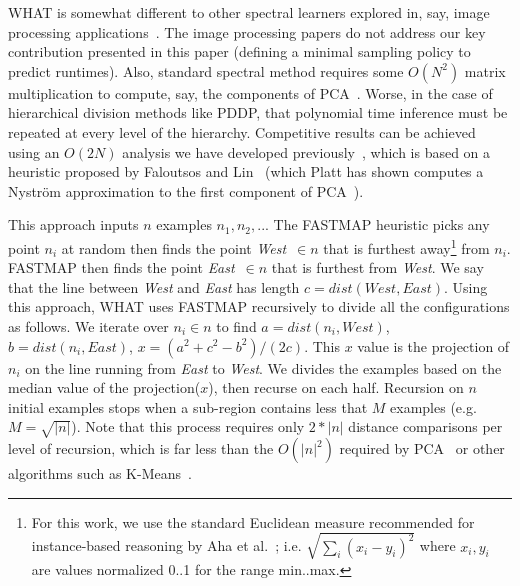 \documentclass{sig-alternative}
\begin{document}
WHAT is somewhat different to other spectral
learners explored in, say, image processing applications~\cite{shi00}.
The image processing papers do not address
our key contribution presented in this paper  (defining
 a minimal sampling policy to predict runtimes).
Also,
standard spectral method requires some $O(N^2)$ matrix multiplication to compute, say, the components
of PCA~\cite{ilin10}. Worse, in the case of hierarchical division methods like PDDP,
that polynomial time inference must be repeated at every level of the hierarchy.
Competitive results can be achieved
using an $O(2N)$ analysis we have developed previously~\cite{me12d}, which is  based on  a heuristic proposed by
Faloutsos and Lin~\cite{Faloutsos1995}
(which
Platt has
  shown computes a Nystr\"om
  approximation to the first component of
  PCA~\cite{platt05}).
  
  This approach inputs
$n$
examples $n_1,n_2,..$. The FASTMAP heuristic
picks any
point $n_i$ at random then  finds
 the point  {\em West}~$\in n$ that is
furthest away\footnote{
 For this work, we use the standard Euclidean measure recommended for
instance-based reasoning by Aha et al.~\cite{aha91};
i.e. $\sqrt{\sum_i(x_i-y_i)^2}$ where $x_i,y_i$
are values normalized 0..1 for the range min..max.}
from $n_i$.
FASTMAP then
finds the point {\em East}~$\in n$
that is furthest from {\em West}.
We say that the line between {\em West} and {\em East} has  length  
$c=\mathit{dist}(\mathit{West},\mathit{East})$.
Using this  approach, WHAT uses FASTMAP recursively to divide all the configurations as follows.
We iterate over $n_i \in n$
to find
$a=\mathit{dist}(n_i,\mathit{West})$,
$b=\mathit{dist}(n_i,\mathit{East})$,
$x=(a^2 + c^2 - b^2)/(2c)$.
This  $x$ value is the projection of $n_i$
on the line  running  from {\em East} to {\em West}.  We divides
the examples based on the median value of the projection($x$),
then recurse on each half. Recursion on
$n$ initial
examples stops when a sub-region
contains less that  $M$ examples (e.g. 
$M=\sqrt{|n|}$).
Note that this process requires only $2*|n|$ distance comparisons
per level of recursion, which is far less than the $O(|n|^2)$
required by PCA~\cite{Du2008}
or other  algorithms such as K-Means~\cite{hamerly2010making}.
\end{document}
